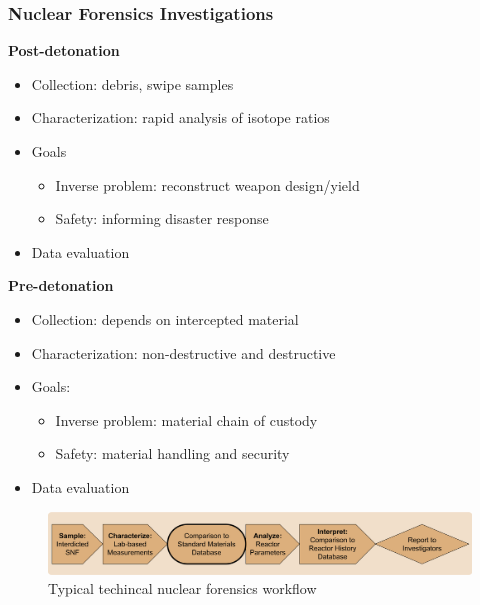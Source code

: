\begin{frame}
  \frametitle{Nuclear Forensics Investigations}
  \begin{minipage}[t]{0.48\textwidth}
    \textbf{Post-detonation}
    \begin{itemize}
      \item Collection: debris, swipe samples
      \item Characterization: rapid analysis of isotope ratios
      \item Goals
      \begin{itemize}
        \item Inverse problem: reconstruct weapon design/yield
        \item Safety: informing disaster response
      \end{itemize}
      \item Data evaluation
    \end{itemize}
  \end{minipage}%
  \hfill
  \begin{minipage}[t]{0.48\textwidth}
    \textbf{Pre-detonation}
    \begin{itemize}
      \item Collection: depends on intercepted material
      \item Characterization: non-destructive and destructive
      \item Goals:
      \begin{itemize}
        \item Inverse problem: material chain of custody
        \item Safety: material handling and security
      \end{itemize}
      \item Data evaluation
    \end{itemize}
  \end{minipage}
  \begin{figure}
    \centering
    \includegraphics[width=\textwidth]{./figures/forensicsrealworld.png}
    \caption{Typical techincal nuclear forensics workflow}
  \end{figure}
\end{frame}
